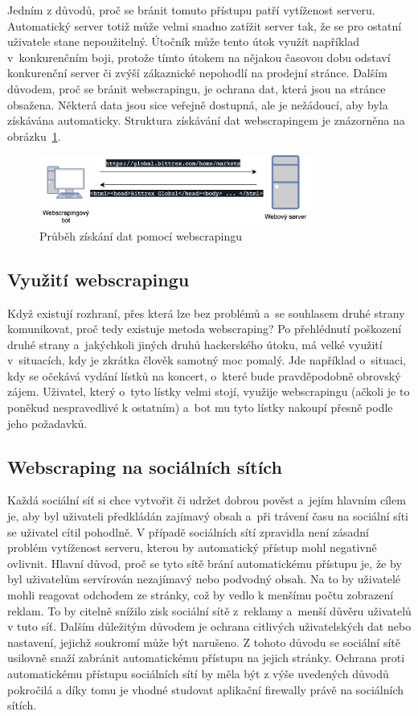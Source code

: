 Jedním z důvodů, proč se bránit tomuto přístupu patří vytíženost serveru. Automatický server totiž může velmi snadno zatížit server tak, že se pro ostatní uživatele stane nepoužitelný. Útočník může tento útok využít například v~konkurenčním boji, protože tímto útokem na nějakou časovou dobu odstaví konkurenční server či zvýší zákaznické nepohodlí na prodejní stránce. Dalším důvodem, proč se bránit webscrapingu, je ochrana dat, která jsou na stránce obsažena. Některá data jsou sice veřejně dostupná, ale je nežádoucí, aby byla získávána automaticky. Struktura získávání dat webscrapingem je znázorněna na obrázku~\ref{img:webscraping}.

\begin{figure}[hbt]
	\centering
	\includegraphics[width=0.8\textwidth]{images/webscraping.png}
	\caption{Průběh získání dat pomocí webscrapingu}
	\label{img:webscraping}
\end{figure}

\subsection*{Využití webscrapingu}
Když existují rozhraní, přes která lze bez problémů a~se souhlasem druhé strany komunikovat, proč tedy existuje metoda webscraping? Po přehlédnutí poškození druhé strany a~jakýchkoli jiných druhů hackerského útoku, má velké využití v~situacích, kdy je zkrátka člověk samotný moc pomalý. Jde například o~situaci, kdy se očekává vydání lístků na koncert, o~které bude pravděpodobně obrovský zájem. Uživatel, který o~tyto lístky velmi stojí, využije webscrapingu (ačkoli je to poněkud nespravedlivé k ostatním) a~bot mu tyto lístky nakoupí přesně podle jeho požadavků.

\subsection*{Webscraping na sociálních sítích}
Každá sociální síť si chce vytvořit či udržet dobrou pověst a~jejím hlavním cílem je, aby byl uživateli předkládán zajímavý obsah a~při trávení času na sociální síti se uživatel cítil pohodlně. V případě sociálních sítí zpravidla není zásadní problém vytíženost serveru, kterou by automatický přístup mohl negativně ovlivnit. Hlavní důvod, proč se tyto sítě brání automatickému přístupu je, že by byl uživatelům servírován nezajímavý nebo podvodný obsah. Na to by uživatelé mohli reagovat odchodem ze stránky, což by vedlo k menšímu počtu zobrazení reklam. To by citelně snížilo zisk sociální sítě z~reklamy a~menší důvěru uživatelů v tuto síť. Dalším důležitým důvodem je ochrana citlivých uživatelských dat nebo nastavení, jejichž soukromí může být narušeno. Z tohoto důvodu se sociální sítě usilovně snaží zabránit automatickému přístupu na jejich stránky. Ochrana proti automatickému přístupu sociálních sítí by měla být z výše uvedených důvodů pokročilá a díky tomu je vhodné studovat aplikační firewally právě na sociálních sítích.

